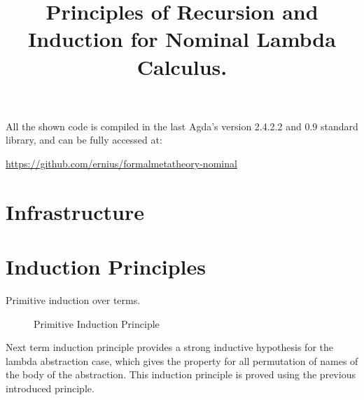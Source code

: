 \documentclass{article}
\title{Principles of Recursion and Induction for Nominal Lambda Calculus.}
\begin{document}
\maketitle

All the shown code is compiled in the last Agda's version 2.4.2.2 and 0.9 standard library, and can be fully accessed at:

\begin{center}
  \href{https://github.com/ernius/formalmetatheory-nominal}{https://github.com/ernius/formalmetatheory-nominal}
\end{center}

\section{Infrastructure}
\label{sec:infra}

 \hspace{5px}

 \hspace{5px}

 \hspace{5px}

 \hspace{5px}

 \hspace{5px}

 \hspace{5px}


\section{Induction Principles}
\label{sec:induction}

Primitive induction over  terms.

\begin{figure}[!ht]
  \caption{Primitive Induction Principle}
\label{fig:primInd}
\end{figure}

Next term induction principle provides a strong inductive hypothesis for the lambda abstraction case, which gives the property for all permutation of names of the body of the abstraction. This induction principle is proved using the previous introduced principle.
\end{document}
